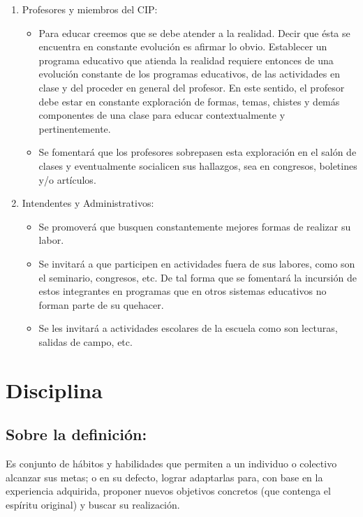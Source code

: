 \documentclass[10pt,letterpaper,oneside]{book}
\begin{document}
\begin{enumerate}[label=\Alph*]
\begin{itemize}
			\end{itemize}
			\item Profesores y miembros del CIP:
		\begin{itemize}
				\item Para educar creemos que se debe atender a la realidad. Decir que ésta se encuentra en constante evolución es afirmar lo obvio. Establecer un programa educativo que atienda la realidad requiere entonces de una evolución constante de los programas educativos, de las actividades en clase y del proceder en general del profesor. En este sentido, el profesor debe estar en constante exploración de formas, temas, chistes y demás componentes de una clase para educar contextualmente y pertinentemente.
				\item Se fomentará que los profesores sobrepasen esta exploración en el salón de clases y eventualmente socialicen sus hallazgos, sea en congresos, boletines y/o artículos.
		\end{itemize}
			\item Intendentes y Administrativos:
			\begin{itemize}
					\item Se promoverá que busquen constantemente mejores formas de realizar su labor.
					\item Se invitará a que participen en actividades fuera de sus labores, como son el seminario, congresos, etc. De tal forma que se fomentará la incursión de estos integrantes en programas que en otros sistemas educativos no forman parte de su quehacer.
					\item Se les invitará a actividades escolares de la escuela como son lecturas, salidas de campo, etc.
			\end{itemize}
\end{enumerate}
		
	\section{Disciplina}
		

		\subsection*{Sobre la definición:}
		Es conjunto de hábitos y habilidades que permiten a un individuo o colectivo alcanzar sus metas; o en su defecto, lograr adaptarlas para, con base en la experiencia adquirida, proponer nuevos objetivos concretos (que contenga el espíritu original) y buscar su realización.
\end{document}
